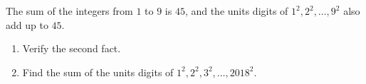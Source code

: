 The sum of the integers from $1$ to $9$ is $45$, and the units digits of $1^2,2^2,\dots,9^2$ also add up to $45$.
\begin{enumerate}
\item[(a)] Verify the second fact.
\item[(b)] Find the sum of the units digits of $1^2,2^2,3^2,\dots,2018^2$.
\end{enumerate}
